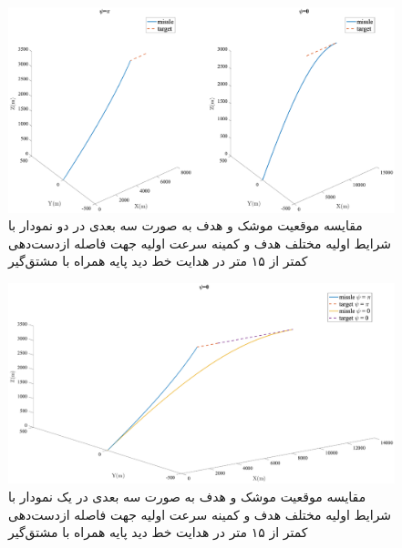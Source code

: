 \begin{figure}[H]
	\centering
	\includegraphics[width=\linewidth]{../Figure/g/3DoF_missle_vs_target_state_low_v}
	\caption{مقایسه موقعیت موشک و هدف به صورت سه بعدی در دو نمودار با شرایط اولیه مختلف هدف و کمینه سرعت اولیه جهت فاصله ازدست‌دهی کمتر از ۱۵ متر در هدایت خط دید پایه همراه با مشتق‌گیر}
\end{figure}

\begin{figure}[H]
	\centering
	\includegraphics[width=\linewidth]{../Figure/g/3DoF_missle_vs_target_state_all_in_low_v}
	\caption{مقایسه موقعیت موشک و هدف به صورت سه بعدی در یک نمودار با شرایط اولیه مختلف هدف و کمینه سرعت اولیه جهت فاصله ازدست‌دهی کمتر از ۱۵ متر در هدایت خط دید پایه همراه با مشتق‌گیر}
\end{figure}



